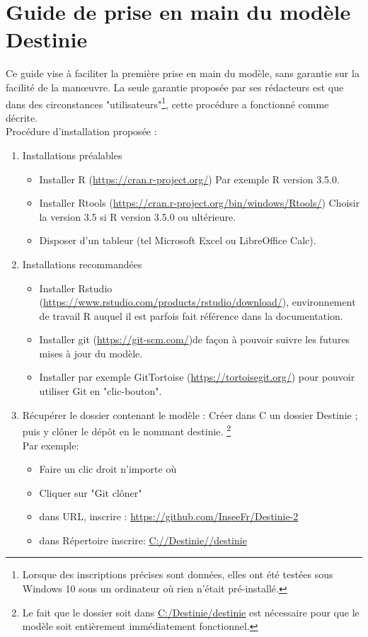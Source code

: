 \section{Guide de prise en main du modèle Destinie}

Ce guide vise à faciliter la première prise en main du modèle, sans garantie sur la facilité de la manœuvre. La seule garantie proposée par ses rédacteurs est que dans des circonstances "utilisateurs"\footnote{Lorsque des inscriptions précises sont données, elles ont été testées sous Windows 10  sous un ordinateur où rien n'était pré-installé.}, cette procédure a fonctionné comme décrite.\\

Procédure d'installation proposée :\\
\begin{enumerate}

\item Installations préalables 
\begin{itemize}
\item Installer	R (\url{https://cran.r-project.org/}) Par exemple R version 3.5.0.
\item Installer	Rtools (\url{https://cran.r-project.org/bin/windows/Rtools/}) Choisir la version 3.5 si R version 3.5.0 ou ultérieure.
\item Disposer d'un tableur (tel Microsoft Excel ou LibreOffice Calc).
\end{itemize}




\item Installations recommandées 
\begin{itemize}
\item Installer	Rstudio (\url{https://www.rstudio.com/products/rstudio/download/}), environnement de travail R auquel il est parfois fait référence dans la documentation.
\item Installer git (\url{https://git-scm.com/})de façon à pouvoir suivre les futures mises à jour du modèle.
\item Installer par exemple GitTortoise (\url{https://tortoisegit.org/}) pour pouvoir utiliser Git en "clic-bouton".
\end{itemize}

\item Récupérer le dossier contenant le modèle : 
Créer dans C  un dossier Destinie ; puis y clôner le dépôt en le nommant destinie. \footnote{Le fait que le dossier soit dans \url{C:/Destinie/destinie} est nécessaire pour que le modèle soit entièrement immédiatement fonctionnel.} \\
Par exemple:
\begin{itemize}
\item Faire un clic droit n’importe où
\item Cliquer sur "Git clôner"
\item  dans URL, inscrire : \url{https://github.com/InseeFr/Destinie-2}
\item dans Répertoire inscrire: \url{C://Destinie//destinie}
\end{itemize}



\end{enumerate}
